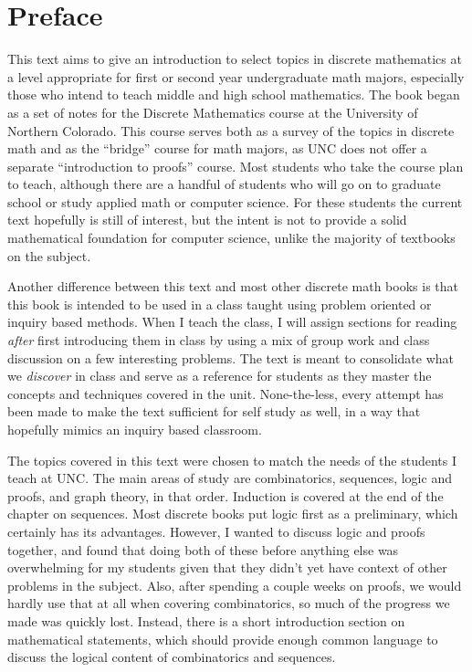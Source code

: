 \documentclass[10pt,]{book}
\theoremstyle{plain}
\theoremstyle{definition}
\theoremstyle{definition}
\numberwithin{equation}{chapter}
\begin{document}
\chapter*{Preface}\label{preface}
\hypertarget{p-7}{}%
This text aims to give an introduction to select topics in discrete mathematics at a level appropriate for first or second year undergraduate math majors, especially those who intend to teach middle and high school mathematics. The book began as a set of notes for the Discrete Mathematics course at the University of Northern Colorado. This course serves both as a survey of the topics in discrete math and as the ``bridge'' course for math majors, as UNC does not offer a separate ``introduction to proofs'' course. Most students who take the course plan to teach, although there are a handful of students who will go on to graduate school or study applied math or computer science. For these students the current text hopefully is still of interest, but the intent is not to provide a solid mathematical foundation for computer science, unlike the majority of textbooks on the subject.%
\par
\hypertarget{p-8}{}%
Another difference between this text and most other discrete math books is that this book is intended to be used in a class taught using problem oriented or inquiry based methods. When I teach the class, I will assign sections for reading \emph{after} first introducing them in class by using a mix of group work and class discussion on a few interesting problems. The text is meant to consolidate what we \emph{discover} in class and serve as a reference for students as they master the concepts and techniques covered in the unit. None-the-less, every attempt has been made to make the text sufficient for self study as well, in a way that hopefully mimics an inquiry based classroom.%
\par
\hypertarget{p-9}{}%
The topics covered in this text were chosen to match the needs of the students I teach at UNC. The main areas of study are combinatorics, sequences, logic and proofs, and graph theory, in that order. Induction is covered at the end of the chapter on sequences. Most discrete books put logic first as a preliminary, which certainly has its advantages. However, I wanted to discuss logic and proofs together, and found that doing both of these before anything else was overwhelming for my students given that they didn't yet have context of other problems in the subject. Also, after spending a couple weeks on proofs, we would hardly use that at all when covering combinatorics, so much of the progress we made was quickly lost.  Instead, there is a short introduction section on mathematical statements, which should provide enough common language to discuss the logical content of combinatorics and sequences.%
\end{document}
